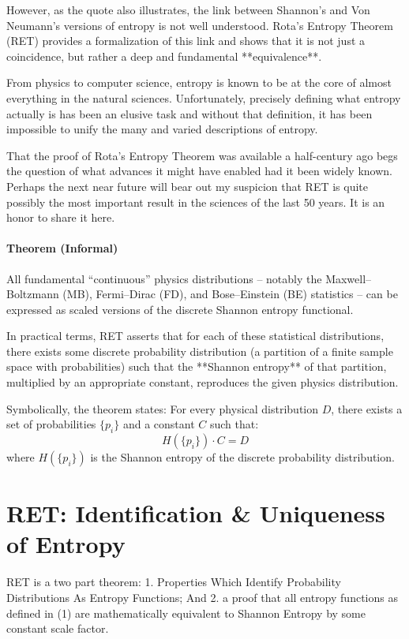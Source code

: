 \documentclass{report}
\begin{document}
However, as the quote also illustrates, the link between Shannon's and Von Neumann's versions of entropy is not well understood. Rota's Entropy Theorem (RET) provides a formalization of this link and shows that it is not just a coincidence, but rather a deep and fundamental **equivalence**. 

From physics to computer science, entropy is known to be at the core of almost everything in the natural sciences. Unfortunately, precisely defining what entropy actually is has been an elusive task and without that definition, it has been impossible to unify the many and varied descriptions of entropy. 


That the proof of Rota's Entropy Theorem was available a half-century ago begs the question of what advances it might have enabled had it been widely known. Perhaps the next near future will bear out my suspicion that RET is quite possibly the most important result in the sciences of the last 50 years. It is an honor to share it here.

\paragraph{Theorem (Informal)} All fundamental “continuous” physics distributions – notably the Maxwell–Boltzmann (MB), Fermi–Dirac (FD), and Bose–Einstein (BE) statistics – can be expressed as scaled versions of the discrete Shannon entropy functional.

In practical terms, RET asserts that for each of these statistical distributions, there exists some discrete probability distribution (a partition of a finite sample space with probabilities) such that the **Shannon entropy** of that partition, multiplied by an appropriate constant, reproduces the given physics distribution. 

Symbolically, the theorem states:  
For every physical distribution \( D \), there exists a set of probabilities \( \{p_i\} \) and a constant \( C \) such that:
\[
H(\{p_i\}) \cdot C = D
\]
where \( H(\{p_i\}) \) is the Shannon entropy of the discrete probability distribution.

\section*{RET: Identification \& Uniqueness of Entropy}
RET is a two part theorem: 1. Properties Which Identify Probability Distributions As Entropy Functions; And 2. a proof that all entropy functions as defined in (1) are mathematically equivalent to Shannon Entropy by some constant scale factor. 
\end{document}
